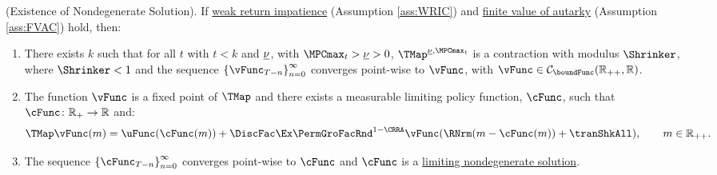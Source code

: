 \documentclass[BufferStockTheory]{subfiles}
\begin{document}
\hypertarget{Sufficient-Conditions-For-Nondegenerate-Solution}{}
\begin{theorem}(Existence of Nondegenerate Solution). \label{thm:convgtobellman}
If \hyperlink{WRIC}{weak return impatience} (Assumption \ref{ass:WRIC}) and \hyperlink{FVAC}{finite value of autarky} (Assumption \ref{ass:FVAC}) hold, then:
%
\begin{enumerate}[label=(\roman*)]
\item There exists $k$ such that for all $t$ with $t<k$ and $\underline{\nu}$, with $\MPCmax_{t}>\MPCminInf>0$, $\TMap^{\MPCminInf, \MPCmax_{t}}$ is a contraction with modulus $\Shrinker$, where $\Shrinker<1$ and the sequence $\left\{\vFunc_{T-n}\right\}_{n=0}^{\infty}$ converges point-wise to $\vFunc$, with $\vFunc \in \mathcal{C}_{\boundFunc}(\mathbb{R}_{++},\mathbb{R})$.
\item The function $\vFunc$ is a fixed point of $\TMap$ and there exists a measurable limiting policy function, $\cFunc$, such that $\cFunc\colon \mathbb{R}_{+}\rightarrow \mathbb{R}$ and:
\begin{equation}\label{eq:stationarybellman}
\TMap\vFunc(m) =  \uFunc(\cFunc(m)) + \DiscFac\Ex \PermGroFacRnd^{1-\CRRA}\vFunc(\RNrm(m -\cFunc(m)) + \tranShkAll) , \qquad m\in \mathbb{R}_{++}. 
\end{equation}
\item  The sequence $\left\{\cFunc_{T-n}\right\}_{n=0}^{\infty}$ converges point-wise to $\cFunc$ and $\cFunc$  is a \hyperlink{Definition-of-a-Nondegenerate-Solution}{limiting nondegenerate solution}.
\end{enumerate}
\end{theorem}
\end{document}
